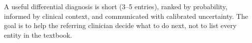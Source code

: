 \begin{pearlbox}[Impression:]
A useful differential diagnosis is short (3--5 entries), ranked by probability, informed by clinical context, and communicated with calibrated uncertainty. The goal is to help the referring clinician decide what to do next, not to list every entity in the textbook.
\end{pearlbox}

\clearpage
